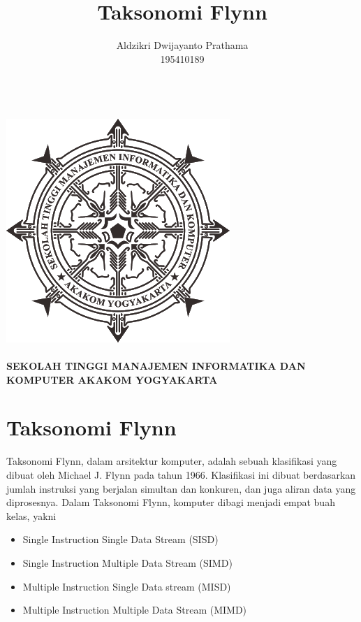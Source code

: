 \documentclass[a4paper,12pt]{article}
\begin{document}
\title{Taksonomi Flynn}
\author{Aldzikri Dwijayanto Prathama 
	\\195410189}
\makeatletter
\begin{titlepage}
	\begin{center}
		{\huge \bfseries \@title }\\[14ex]
		\includegraphics[scale=.8]{logo}\\[4ex]
		{\large \@author}\\[20ex]
		{\large \bfseries {SEKOLAH TINGGI MANAJEMEN INFORMATIKA DAN KOMPUTER
				AKAKOM YOGYAKARTA}}
	\end{center}


\end{titlepage}
\makeatother
\newpage
\tableofcontents
\newpage
\section{Taksonomi Flynn}
Taksonomi Flynn, dalam arsitektur komputer, adalah sebuah klasifikasi yang dibuat oleh Michael J. Flynn pada tahun 1966. Klasifikasi ini dibuat berdasarkan jumlah instruksi yang berjalan simultan dan konkuren, dan juga aliran data yang diprosesnya. Dalam Taksonomi Flynn, komputer dibagi menjadi empat buah kelas, yakni
\begin{itemize}
    \item Single Instruction Single Data Stream (SISD)
    \item Single Instruction Multiple Data Stream (SIMD)
    \item Multiple Instruction Single Data stream (MISD)
    \item Multiple Instruction Multiple Data Stream (MIMD)
\end{itemize}
\end{document}
